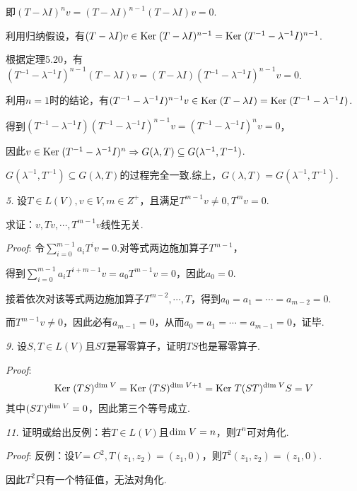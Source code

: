 即$(T-\lambda I)^n v=(T-\lambda I)^{n-1}(T-\lambda I)v=0$.

利用归纳假设，有$(T-\lambda I)v \in \mathrm{Ker \;} (T-\lambda I)^{n-1}=\mathrm{Ker \;} (T^{-1}-\lambda^{-1} I)^{n-1}$.

根据定理5.20，有$(T^{-1}-\lambda^{-1} I)^{n-1}(T-\lambda I)v=(T-\lambda I)(T^{-1}-\lambda^{-1} I)^{n-1}v=0$.

利用$n=1$时的结论，有$(T^{-1}-\lambda^{-1} I)^{n-1}v \in \mathrm{Ker \;} (T-\lambda I)=\mathrm{Ker \;} (T^{-1}-\lambda^{-1} I)$.

得到$(T^{-1}-\lambda^{-1} I)(T^{-1}-\lambda^{-1} I)^{n-1}v=(T^{-1}-\lambda^{-1} I)^n v=0$，

因此$v \in \mathrm{Ker \;} (T^{-1}-\lambda^{-1} I)^n \Rightarrow G(\lambda,T) \subseteq G(\lambda^{-1},T^{-1})$.

$G(\lambda^{-1},T^{-1}) \subseteq G(\lambda,T)$的过程完全一致.综上，$G(\lambda,T)=G(\lambda^{-1},T^{-1})$.

\hspace*{\fill}

\textit{5.}
设$T \in L(V),v \in V,m \in Z^+$，且满足$T^{m-1}v \ne 0,T^m v=0$.

求证：$v,Tv,\cdots,T^{m-1}v$线性无关.

\textit{Proof}:
令$\sum_{i=0}^{m-1} a_iT^i v=0$.对等式两边施加算子$T^{m-1}$，

得到$\sum_{i=0}^{m-1} a_iT^{i+m-1} v=a_0T^{m-1} v=0$，因此$a_0=0$.

接着依次对该等式两边施加算子$T^{m-2},\cdots,T$，得到$a_0=a_1=\cdots=a_{m-2}=0$.

而$T^{m-1}v \ne 0$，因此必有$a_{m-1}=0$，从而$a_0=a_1=\cdots=a_{m-1}=0$，证毕.

\hspace*{\fill}

\textit{9.}
设$S,T \in L(V)$且$ST$是幂零算子，证明$TS$也是幂零算子.

\textit{Proof}:
    \begin{align*}
        \mathrm{Ker \;} (TS)^{\mathrm{dim \;} V}=\mathrm{Ker \;} (TS)^{\mathrm{dim \;} V+1}=\mathrm{Ker \;} T(ST)^{\mathrm{dim \;} V}S=V
    \end{align*}
其中$(ST)^{\mathrm{dim \;} V}=0$，因此第三个等号成立.

\hspace*{\fill}

\textit{11.}
证明或给出反例：若$T \in L(V)$且$\mathrm{dim \;} V=n$，则$T^n$可对角化.

\textit{Proof}:
反例：设$V=C^2,T(z_1,z_2)=(z_1,0)$，则$T^2(z_1,z_2)=(z_1,0)$.

因此$T^2$只有一个特征值，无法对角化.


